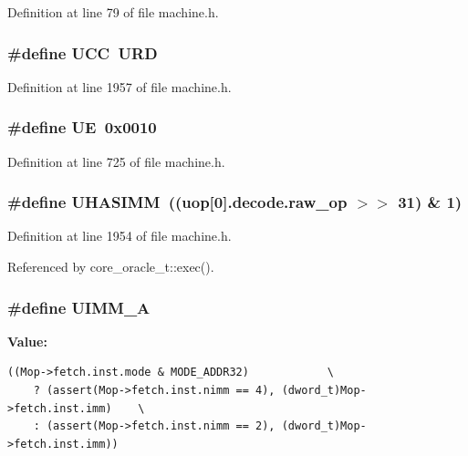 Definition at line 79 of file machine.h.
\subsubsection[{UCC}]{\setlength{\rightskip}{0pt plus 5cm}\#define UCC~URD}\label{machine_8h_5543e4e112fad47a6b8e0085e77475b3}




Definition at line 1957 of file machine.h.
\subsubsection[{UE}]{\setlength{\rightskip}{0pt plus 5cm}\#define UE~0x0010}\label{machine_8h_23a444cc88f10292ecf46694ac66f37d}




Definition at line 725 of file machine.h.
\subsubsection[{UHASIMM}]{\setlength{\rightskip}{0pt plus 5cm}\#define UHASIMM~((uop[0].decode.raw\_\-op $>$$>$ 31) \& 1)}\label{machine_8h_b1978599c102a26af3174336e11c6ec9}




Definition at line 1954 of file machine.h.

Referenced by core\_\-oracle\_\-t::exec().
\subsubsection[{UIMM\_\-A}]{\setlength{\rightskip}{0pt plus 5cm}\#define UIMM\_\-A}\label{machine_8h_48529276b107b54227a249b53239a6b5}


\textbf{Value:}

\begin{Code}\begin{verbatim}((Mop->fetch.inst.mode & MODE_ADDR32)            \
    ? (assert(Mop->fetch.inst.nimm == 4), (dword_t)Mop->fetch.inst.imm)    \
    : (assert(Mop->fetch.inst.nimm == 2), (dword_t)Mop->fetch.inst.imm))
\end{verbatim}
\end{Code}


